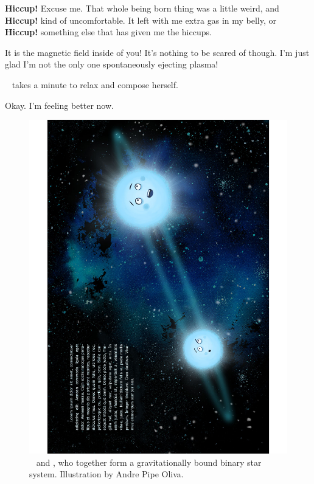 \documentclass[main.tex]{subfiles}
\begin{document}
\par \Merope \textbf{Hiccup!}  Excuse me.  That whole being born thing was a little weird, and \textbf{Hiccup!} kind of uncomfortable.  It left with me extra gas in my belly, or \textbf{Hiccup!} something else that has given me the hiccups.  

\par \Alcyone It is the magnetic field inside of you!  It's nothing to be scared of though.  I'm just glad I'm not the only one spontaneously ejecting plasma!

\par \nar \rmmerope~ takes a minute to relax and compose herself.

\par \Merope Okay.  I'm feeling better now.  

\begin{figure}
\includegraphics[width=\columnwidth,angle=270,origin=c]{ch1_1.pdf}
\caption{\rmmaia~ and \rmmerope, who together form a gravitationally bound binary star system.  Illustration by Andre Pipe Oliva.
\label{fig:fig1}}
\end{figure}
\end{document}
